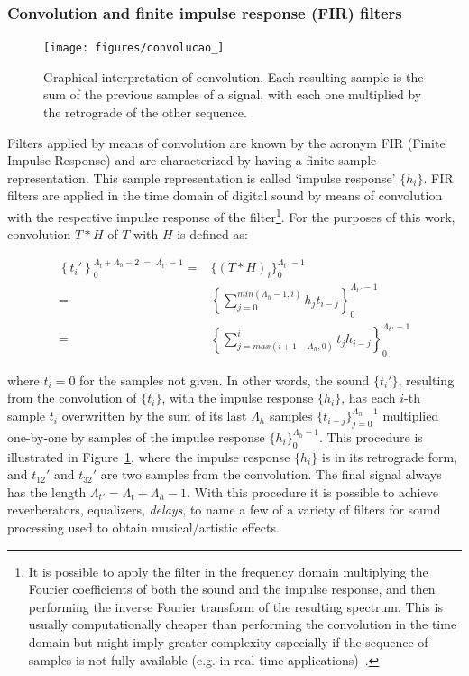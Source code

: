 \subsubsection{Convolution and finite impulse response (FIR) filters}\label{subsec:conv}
\begin{figure}
     \centering
         \texttt{[image: figures/convolucao\_]}
     \caption{Graphical interpretation of convolution. Each resulting sample is the sum of the previous samples of a signal, with each one multiplied by the retrograde of the other sequence.}
         \label{fig:conv}
\end{figure}

Filters applied by means of convolution are known by the acronym FIR (Finite Impulse Response) and are characterized by having a finite sample representation. This sample representation is called `impulse response' $\{h_i\}$. FIR filters are applied in the time domain of digital sound by means of convolution with the respective impulse response of the filter\footnote{It
is possible to apply the filter in the frequency domain multiplying the Fourier coefficients of both the sound and the impulse response, and then performing the inverse Fourier transform of the resulting spectrum.
This is usually computationally cheaper than performing the convolution in the time domain
but might imply greater complexity especially if the sequence of samples is not fully available (e.g. in real-time applications)~\cite{Openheim}.}. For the purposes of this work, convolution $T*H$ of $T$ with $H$ is defined as:

\begin{equation}\label{eq:conv}
 \begin{split}
 \left\{t_i'\right\}_0^{\Lambda_t+\Lambda_h-2\; = \;\Lambda_{t\, '}-1} = & \{(T*H)_i\}_0^{\Lambda_{t \, '}-1} \\ = & \left \{ \sum_{j=0}^{min(\Lambda_h-1,i)}h_{j} t_{i-j} \right \}_0^{\Lambda_{t\, '}-1} 
     \\ = & \left \{ \sum_{j=max(i+1-\Lambda_h,0)}^{i}t_j h_{i-j} \right \}_0^{\Lambda_{t\, '}-1}
 \end{split}
\end{equation}

\noindent where $t_i=0$ for the samples not given.
In other words, the sound $\{t_i'\}$, resulting from the convolution of $\{t_i\}$, with the impulse response $\{h_i\}$, has each $i$-th sample $t_i$ overwritten by the sum of its last $\Lambda_h$ samples $\{t_{i-j}\}_{j=0}^{\Lambda_h-1}$ multiplied one-by-one by samples of the impulse response $\{h_i\}_0^{\Lambda_h-1}$. This procedure is illustrated in Figure~\ref{fig:conv}, where the impulse response $\{h_i\}$ is in its retrograde form, and $t_{12}'$ and $t_{32}'$ are two samples from the convolution. The final signal always has the length $\Lambda_{t'}=\Lambda_t+\Lambda_h -1$.
With this procedure it is possible to achieve reverberators, equalizers, \emph{delays}, to name a few of a variety of filters for sound processing used to obtain musical/artistic effects.

